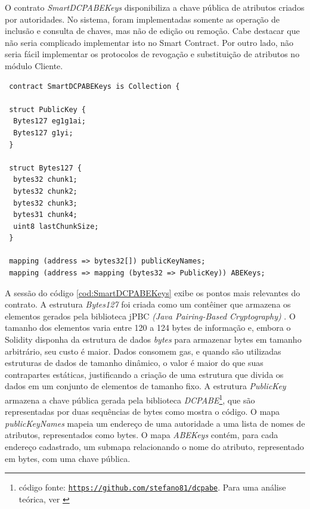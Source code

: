 \documentclass[a4paper,11pt]{article}
\begin{document}


O contrato \emph{SmartDCPABEKeys} disponibiliza a chave pública de atributos criados por autoridades.
No sistema, foram implementadas somente as operação de inclusão e consulta de chaves, mas não de edição ou remoção.
Cabe destacar que não seria complicado implementar isto no Smart Contract.
Por outro lado, não seria fácil implementar os protocolos de revogação e substituição de atributos no módulo Cliente.%


\begin{lstlisting}
 contract SmartDCPABEKeys is Collection {

 struct PublicKey {
  Bytes127 eg1g1ai;
  Bytes127 g1yi;
 }

 struct Bytes127 {
  bytes32 chunk1;
  bytes32 chunk2;
  bytes32 chunk3;
  bytes31 chunk4;
  uint8 lastChunkSize;
 }

 mapping (address => bytes32[]) publicKeyNames;
 mapping (address => mapping (bytes32 => PublicKey)) ABEKeys;
\end{lstlisting}


A sessão do código \ref{cod:SmartDCPABEKeys} exibe os pontos mais relevantes do contrato.
A estrutura \emph{Bytes127} foi criada como um contêiner que armazena os elementos gerados pela biblioteca jPBC \emph{(Java Pairing-Based Cryptography)} \cite{DeCaro2011}.
O tamanho dos elementos varia entre 120 a 124 bytes de informação e, embora o Solidity disponha da estrutura de dados \emph{bytes} para armazenar bytes em tamanho arbitrário, seu custo é maior.
Dados consomem gas, e quando são utilizadas estruturas de dados de tamanho dinâmico, o valor é maior do que suas contrapartes estáticas, justificando a criação de uma estrutura que divida os dados em um conjunto de elementos de tamanho fixo.
A estrutura \emph{PublicKey} armazena a chave pública gerada pela biblioteca \emph{DCPABE}\footnote{código fonte: \href{https://github.com/stefano81/dcpabe}{\texttt{https://github.com/stefano81/dcpabe}}. Para uma análise teórica, ver \cite{Lewko2011}}, que são representadas por duas sequências de bytes como mostra o código.
O mapa \emph{publicKeyNames} mapeia um endereço de uma autoridade a uma lista de nomes de atributos, representados como bytes.
O mapa \emph{ABEKeys} contém, para cada endereço cadastrado, um submapa relacionando o nome do atributo, representado em bytes, com uma chave pública.
\end{document}

